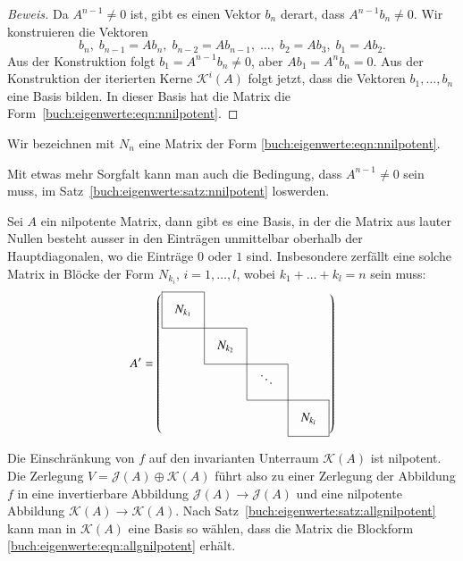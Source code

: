 \begin{proof}[Beweis]
Da $A^{n-1}\ne 0$ ist, gibt es einen Vektor $b_n$ derart, dass $A^{n-1}b_n\ne0$.
Wir konstruieren die Vektoren
\[
b_n,\;
b_{n-1}=Ab_n,\;
b_{n-2}=Ab_{n-1},\;
\dots,\;
b_2=Ab_3,\;
b_1=Ab_2.
\]
Aus der Konstruktion folgt $b_1=A^{n-1}b_n\ne 0$, aber $Ab_1=A^nb_n=0$.
Aus der Konstruktion der iterierten Kerne $\mathcal{K}^i(A)$ folgt jetzt,
dass die Vektoren $b_1,\dots,b_n$ eine Basis bilden.
In dieser Basis hat die Matrix die Form~\ref{buch:eigenwerte:eqn:nnilpotent}.
\end{proof}

\begin{definition}
Wir bezeichnen mit $N_n$ eine Matrix der Form
\eqref{buch:eigenwerte:eqn:nnilpotent}.
\end{definition}

Mit etwas mehr Sorgfalt kann man auch die Bedingung, dass $A^{n-1}\ne 0$
sein muss, im Satz~\ref{buch:eigenwerte:satz:nnilpotent} loswerden.

\begin{satz}
\label{buch:eigenwerte:satz:allgnilpotent}
Sei $A$ ein nilpotente Matrix, dann gibt es eine Basis, in der die Matrix
aus lauter Nullen besteht ausser in den Einträgen unmittelbar oberhalb der 
Hauptdiagonalen, wo die Einträge $0$ oder $1$ sind.
Insbesondere zerfällt eine solche Matrix in Blöcke der Form $N_{k_i}$,
$i=1,\dots,l$,
wobei $k_1+\dots+k_l=n$ sein muss:
\begin{equation}
\def\temp#1{\multicolumn{1}{|c}{\raisebox{0pt}[17pt][12pt]{\phantom{x}$#1\mathstrut$}\phantom{x}}}
A'
=\left(
\begin{array}{cccc}
\cline{1-1}
\temp{N_{k_1}} &\multicolumn{1}{|c}{}&        &           \\
\cline{1-2}
          &\temp{N_{k_2}}&\multicolumn{1}{|c}{}&           \\
\cline{2-3}
          &           &\temp{\ddots}&\multicolumn{1}{|c}{}\\
\cline{3-4}
          &           &        &\multicolumn{1}{|c|}{\raisebox{0pt}[17pt][12pt]{\phantom{x}$N_{k_l}$}\phantom{x}}\\
\cline{4-4}
\end{array}
\right)
\label{buch:eigenwerte:eqn:allgnilpotent}
\end{equation}
\end{satz}

Die Einschränkung von $f$ auf den invarianten Unterraum $\mathcal{K}(A)$
ist nilpotent.
Die Zerlegung $V=\mathcal{J}(A)\oplus \mathcal{K}(A)$ führt also zu einer
Zerlegung der Abbildung $f$ in eine invertierbare Abbildung
$\mathcal{J}(A)\to\mathcal{J}(A)$ und eine
nilpotente Abbildung $\mathcal{K}(A)\to\mathcal{K}(A)$.
Nach Satz~\ref{buch:eigenwerte:satz:allgnilpotent} kann man in
$\mathcal{K}(A)$ eine Basis so wählen, dass die Matrix die Blockform
\eqref{buch:eigenwerte:eqn:allgnilpotent} erhält.

